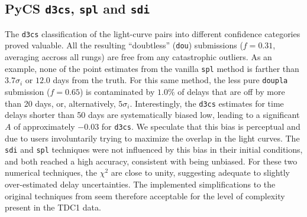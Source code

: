 \documentclass[traditabstract]{aa}
\begin{document}
\subsection{PyCS {\tt d3cs}, {\tt spl} and {\tt sdi}}

The {\tt d3cs} classification of the light-curve pairs into different confidence categories proved valuable. All the resulting ``doubtless'' ({\tt dou}) submissions ($f=0.31$, averaging accross all rungs) are free from any catastrophic outliers. As an example, none of the point estimates from the vanilla {\tt spl} method is farther than $3.7 \sigma_i$ or $12.0$ days from the truth. For this same method, the less pure {\tt doupla} submission ($f=0.65$) is contaminated by $1.0\%$ of delays that are off by more than 20 days, or, alternatively, $5 \sigma_i$. Interestingly, the {\tt d3cs} estimates for time delays shorter than 50 days are systematically biased low, leading to a significant $A$ of approximately $-0.03$ for {\tt d3cs}. We speculate that this bias is perceptual and due to users involuntarily trying to maximize the overlap in the light curves. The {\tt sdi} and {\tt spl} techniques were not influenced by this bias in their initial conditions, and both reached a high accuracy, consistent with being unbiased. For these two numerical techniques, the $\chi^2$ are close to unity, suggesting adequate to slightly over-estimated delay uncertainties. The implemented simplifications to the original techniques from \citet{pycs} seem therefore  acceptable for the level of complexity present in the TDC1 data.











\end{document}
